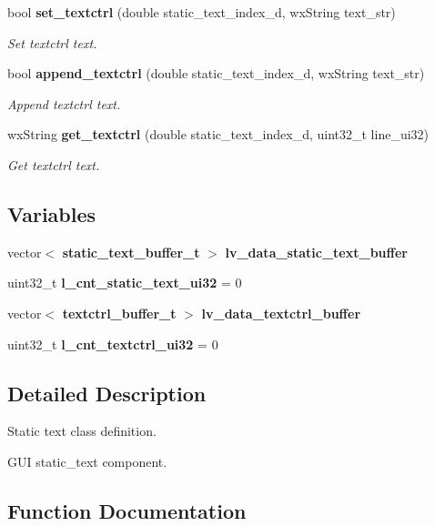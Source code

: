 \begin{DoxyCompactItemize}
bool \textbf{ set\+\_\+textctrl} (double static\+\_\+text\+\_\+index\+\_\+d, wx\+String text\+\_\+str)
\begin{DoxyCompactList}\small\item\em Set textctrl text. \end{DoxyCompactList}\item 
bool \textbf{ append\+\_\+textctrl} (double static\+\_\+text\+\_\+index\+\_\+d, wx\+String text\+\_\+str)
\begin{DoxyCompactList}\small\item\em Append textctrl text. \end{DoxyCompactList}\item 
wx\+String \textbf{ get\+\_\+textctrl} (double static\+\_\+text\+\_\+index\+\_\+d, uint32\+\_\+t line\+\_\+ui32)
\begin{DoxyCompactList}\small\item\em Get textctrl text. \end{DoxyCompactList}\end{DoxyCompactItemize}
\subsection*{Variables}
\begin{DoxyCompactItemize}
\item 
vector$<$ \textbf{ static\+\_\+text\+\_\+buffer\+\_\+t} $>$ \textbf{ lv\+\_\+data\+\_\+static\+\_\+text\+\_\+buffer}
\item 
\mbox{\label{group___static__text_ga36d872b1240e208aac1eb9ea3802cab3}} 
uint32\+\_\+t {\bfseries l\+\_\+cnt\+\_\+static\+\_\+text\+\_\+ui32} = 0
\item 
vector$<$ \textbf{ textctrl\+\_\+buffer\+\_\+t} $>$ \textbf{ lv\+\_\+data\+\_\+textctrl\+\_\+buffer}
\item 
\mbox{\label{group___static__text_ga408c63166cadb78b37c89ad5aeb7cf33}} 
uint32\+\_\+t {\bfseries l\+\_\+cnt\+\_\+textctrl\+\_\+ui32} = 0
\end{DoxyCompactItemize}


\subsection{Detailed Description}
Static text class definition. 

G\+UI static\+\_\+text component.

\subsection{Function Documentation}
\mbox{\label{group___static__text_ga490542606fe12f142cd2b00cb1ecaefd}} 
